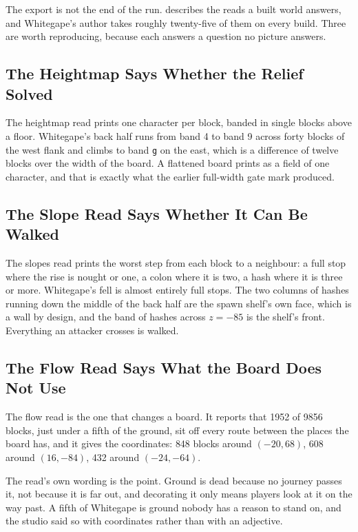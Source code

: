 The export is not the end of the run.  describes the reads a
built world answers, and Whitegape's author takes roughly twenty-five of them on
every build. Three are worth reproducing, because each answers a question no
picture answers.

\subsection{The Heightmap Says Whether the Relief Solved}

The heightmap read prints one character per block, banded in single blocks above
a floor. Whitegape's back half runs from band 4 to band 9 across forty blocks
of the west flank and climbs to band \texttt{g} on the east, which is a
difference of twelve blocks over the width of the board. A flattened board
prints as a field of one character, and that is exactly what the earlier
full-width gate mark produced.

\subsection{The Slope Read Says Whether It Can Be Walked}

The slopes read prints the worst step from each block to a neighbour: a
full stop where the rise is nought or one, a colon where it is two, a hash where
it is three or more. Whitegape's fell is almost entirely full stops. The two
columns of hashes running down the middle of the back half are the spawn
shelf's own face, which is a wall by design, and the band of hashes across
$z=-85$ is the shelf's front. Everything an attacker crosses is walked.

\subsection{The Flow Read Says What the Board Does Not Use}

The flow read is the one that changes a board. It reports that 1952 of 9856
blocks, just under a fifth of the ground, sit off every route between the places
the board has, and it gives the coordinates: 848 blocks around $(-20, 68)$, 608
around $(16, -84)$, 432 around $(-24, -64)$.

The read's own wording is the point. Ground is dead because no journey passes
it, not because it is far out, and decorating it only means players look at it
on the way past. A fifth of Whitegape is ground nobody has a reason to stand on,
and the studio said so with coordinates rather than with an adjective.

